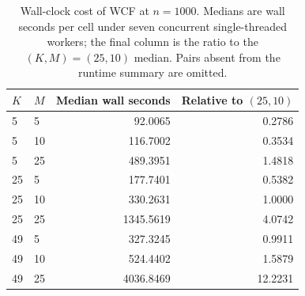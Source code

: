 \begin{table}[t]
\centering
\scriptsize
\setlength{\tabcolsep}{3pt}
\caption{Wall-clock cost of WCF at $n=1000$. Medians are wall seconds per cell under seven concurrent single-threaded workers; the final column is the ratio to the $(K,M)=(25,10)$ median. Pairs absent from the runtime summary are omitted.}
\label{tab:sensitivity-cost}
\begin{tabular}{llrr}
\toprule
$K$ & $M$ & Median wall seconds & Relative to $(25,10)$ \\
\midrule
5 & 5 & 92.0065 & 0.2786 \\
5 & 10 & 116.7002 & 0.3534 \\
5 & 25 & 489.3951 & 1.4818 \\
25 & 5 & 177.7401 & 0.5382 \\
25 & 10 & 330.2631 & 1.0000 \\
25 & 25 & 1345.5619 & 4.0742 \\
49 & 5 & 327.3245 & 0.9911 \\
49 & 10 & 524.4402 & 1.5879 \\
49 & 25 & 4036.8469 & 12.2231 \\
\bottomrule
\end{tabular}
\end{table}
